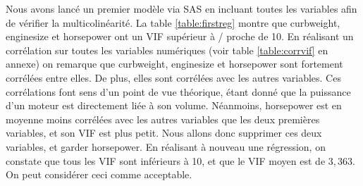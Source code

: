 \documentclass[11pt,a4paper]{article}
\begin{document}
Nous avons lancé un premier modèle via SAS en incluant toutes les variables afin de vérifier la multicolinéarité. La table \ref{table:firstreg} montre que curbweight, enginesize et horsepower ont un VIF supérieur à / proche de 10. En réalisant un corrélation sur toutes les variables numériques (voir table \ref{table:corrvif} en annexe) on remarque que curbweight, enginesize et horsepower sont fortement corrélées entre elles. De plus, elles sont corrélées avec les autres variables. Ces corrélations font sens d'un point de vue théorique, étant donné que la puissance d'un moteur est directement liée à son volume. Néanmoins, horsepower est en moyenne moins corrélées avec les autres variables que les deux premières variables, et son VIF est plus petit. Nous allons donc supprimer ces deux variables, et garder horsepower. En réalisant à nouveau une régression, on constate que tous les VIF sont inférieurs à 10, et que le VIF moyen est de $3,363$. On peut considérer ceci comme acceptable.
\end{document}
